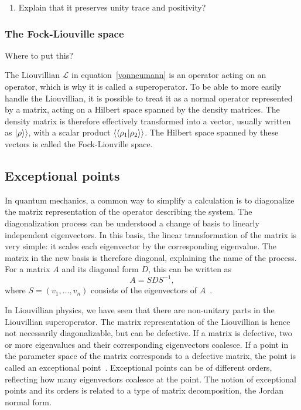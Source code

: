 \documentclass[../main.tex]{subfiles}
\begin{document}
\begin{enumerate}
    \item Explain that it preserves unity trace and positivity?
\end{enumerate}


\subsubsection{The Fock-Liouville space}
Where to put this?

The Liouvillian $\mathcal{L}$ in equation~\eqref{vonneumann} is an operator acting on an operator, which is why it is called a superoperator. To be able to more easily handle the Liouvillian, it is possible to treat it as a normal operator represented by a matrix, acting on a Hilbert space spanned by the density matrices. The density matrix is therefore effectively transformed into a vector, usually written as $\ket{\rho}\rangle$, with a scalar product $\langle\braket{\rho_1|\rho_2}\rangle$. The Hilbert space spanned by these vectors is called the Fock-Liouville space.


\subsection{Exceptional points}\label{sec:ep}
In quantum mechanics, a common way to simplify a calculation is to diagonalize the matrix representation of the operator describing the system. The diagonalization process can be understood a change of basis to linearly independent eigenvectors. In this basis, the linear transformation of the matrix is very simple: it scales each eigenvector by the corresponding eigenvalue. The matrix in the new basis is therefore diagonal, explaining the name of the process. For a matrix $A$ and its diagonal form $D$, this can be written as 
\begin{equation}
    A = SDS^{-1},
\end{equation}
where $S = (v_1, \dots ,v_n)$ consists of the eigenvectors of $A$~\cite{uffe}.

In Liouvillian physics, we have seen that there are non-unitary parts in the Liouvillian superoperator. The matrix representation of the Liouvillian is hence not necessarily diagonalizable, but can be defective. If a matrix is defective, two or more eigenvalues and their corresponding eigenvectors coalesce. If a point in the parameter space of the matrix corresponds to a defective matrix, the point is called an exceptional point~\cite{nonHermrev}. Exceptional points can be of different orders, reflecting how many eigenvectors coalesce at the point. The notion of exceptional points and its orders is related to a type of matrix decomposition, the Jordan normal form.
\end{document}
